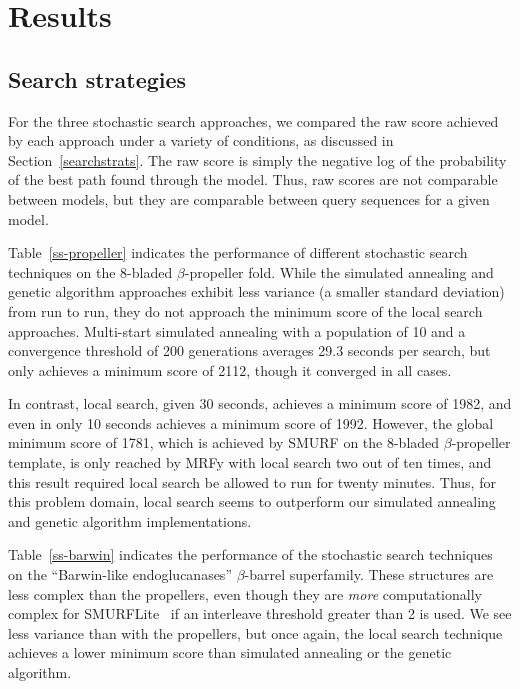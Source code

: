 \documentclass{acm_proc_article-sp}
\begin{document}
\section{Results}

\subsection{Search strategies}

For the three stochastic search approaches, we compared the raw score achieved
by each approach under a variety of conditions, as discussed in 
Section~\ref{searchstrats}.
The raw score is simply the negative log of the probability of the best path
found through the model.
Thus, raw scores are not comparable between models, but they are comparable
between query sequences for a given model.

Table~\ref{ss-propeller} indicates the performance of different stochastic
search techniques on the 8-bladed $\beta$-propeller fold.
While the simulated annealing and genetic algorithm approaches exhibit less
variance (a smaller standard deviation) from run to run, they do not approach
the minimum score of the local search approaches. Multi-start simulated 
annealing with a population of 10 and a convergence threshold of 200 generations
averages 29.3 seconds per search, but only achieves a minimum score of 2112, 
though it converged in all cases.

In contrast, local search, given 30 seconds, achieves a minimum score of 1982, 
and even in only 10 seconds achieves a minimum score of 1992.
However, the global minimum score of 1781, which is achieved by SMURF on the
8-bladed $\beta$-propeller template, is only reached by MRFy with local search
two out of ten times, and this result required local search be allowed to run
for twenty minutes.
Thus, for this problem domain, local search seems to outperform our simulated
annealing and genetic algorithm implementations.


Table~\ref{ss-barwin} indicates the performance of the stochastic
search techniques on the ``Barwin-like endoglucanases'' $\beta$-barrel 
superfamily.
These structures are less complex than the propellers, even though they are
\emph{more} computationally complex for SMURFLite~\cite{Daniels:2012dg} if an 
interleave threshold greater than 2 is used. 
We see less variance than with the propellers, but once again, the local search
technique achieves a lower minimum score than simulated annealing or the genetic
algorithm.
\end{document}
